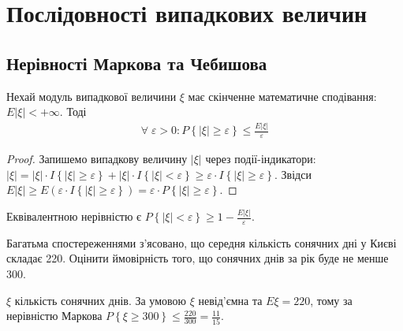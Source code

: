 \section{Послідовності випадкових величин}
\subsection{Нерівності Маркова та Чебишова}
\begin{theorem*}
    Нехай модуль випадкової величини $\xi$ має скінченне математичне сподівання: $E|\xi| < +\infty$.
    Тоді 
    \begin{gather}\label{Markov_ineq}
        \forall \; \varepsilon >0 : P\left\{ |\xi| \geq \varepsilon\right\} \leq \frac{E|\xi|}{\varepsilon}
    \end{gather}
\end{theorem*}
\begin{proof}
    Запишемо випадкову величину $|\xi|$ через події-індикатори: 
    $|\xi| = |\xi|\cdot I\left\{|\xi| \geq \varepsilon\right\} + |\xi|\cdot I\left\{|\xi| < \varepsilon\right\} \geq
    \varepsilon\cdot I\left\{|\xi| \geq \varepsilon\right\}$. Звідси $E|\xi| \geq E \left( \varepsilon\cdot I\left\{|\xi| \geq \varepsilon\right\}\right) =
    \varepsilon \cdot P\left\{ |\xi| \geq \varepsilon\right\}$.
\end{proof}
\begin{remark}
    Еквівалентною нерівністю є $P\left\{ |\xi| < \varepsilon\right\} \geq 1 - \frac{E|\xi|}{\varepsilon}$.
\end{remark}

\begin{example}
    Багатьма спостереженнями з'ясовано, що середня кількість
    сонячних дні у Києві складає 220. Оцінити ймовірність того, що
    сонячних днів за рік буде не менше 300.

     $\xi$ кількість сонячних днів. За умовою $\xi$ невід'ємна та $E\xi = 220$,
    тому за нерівністю Маркова $P\left\{ \xi \geq 300\right\} \leq \frac{220}{300} = \frac{11}{15}$.
\end{example}

